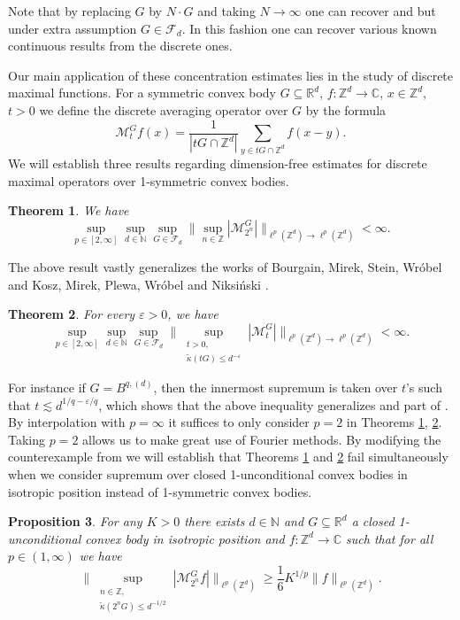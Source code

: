 \documentclass[a4paper,oneside, reqno]{amsart}
\numberwithin{equation}{section}
\newtheorem{Thm}{Theorem}[section]
\newtheorem{Prop}[Thm]{Proposition}
\theoremstyle{definition}%
\theoremstyle{definition}
\theoremstyle{definition}%
\theoremstyle{definition}
\newcommand{\Z}{\mathbb{Z}}
\newcommand{\R}{\mathbb{R}}
\newcommand{\C}{\mathbb{C}}
\newcommand{\N}{\mathbb{N}}
\begin{document}
Note that by replacing $G$ by $N\cdot G$ and taking $N \to \infty$ one can recover \cite[Theorem 1.2]{bob-naz} and \cite[Theorem 1.1]{Pa} but under extra assumption $G \in \mathcal{F}_d$. In this fashion one can recover various known continuous results from the discrete ones. 
\par Our main application of these concentration estimates lies in the study of discrete maximal functions.
For a symmetric convex body $G \subseteq \R^d$, $f: \Z^d \to \C$, $x \in \Z^d$, $t>0$ we define the discrete averaging operator over $G$ by the formula
\[
\mathcal{M}_t^G f(x)= \frac{1}{|tG \cap \Z^d|} \sum_{y \in tG \cap \Z^d} f(x-y).
\]
We will establish three results regarding dimension-free estimates for discrete maximal operators over 1-symmetric convex bodies.
\begin{Thm} \label{dyadic dim-free}
 We have 
 \[
 \sup_{p \in [2,\infty]} \sup_{d \in \N} \sup_{G \in \mathcal{F}_d} \Big\| \sup_{n \in \Z} |\mathcal{M}_{2^n}^G| \Big\|_{\ell^p(\Z^d) \to \ell^p(\Z^d)}< \infty.
 \]
\end{Thm}
The above result vastly generalizes the works of Bourgain, Mirek, Stein, Wróbel \cite{balls} and Kosz, Mirek, Plewa, Wróbel \cite[Theorem 3]{KMPW} and Niksiński \cite{Ni2}.
\begin{Thm} \label{small scale dim-free}
 For every $\varepsilon>0$, we have 
 \[
 \sup_{p \in [2,\infty]} \sup_{d \in \N} \sup_{G \in \mathcal{F}_d} \Big\| \sup_{\substack{t>0, \\
 \widetilde{\kappa}(tG) \le d^{-\varepsilon}}} |\mathcal{M}_{t}^G| \Big\|_{\ell^p(\Z^d) \to \ell^p(\Z^d)}< \infty.
 \]
\end{Thm} 
For instance if $G=B^{q,(d)}$, then the innermost supremum is taken over $t$'s such that $t \lesssim d^{1/q-\varepsilon/q}$, which shows that the above inequality generalizes \cite[Theorem 1.1]{NW} and part of \cite[Theorem 1.15]{KNW}.
By interpolation with $p=\infty$ it suffices to only consider $p=2$ in Theorems \ref{dyadic dim-free}, \ref{small scale dim-free}. Taking $p=2$ allows us to make great use of Fourier methods.
By modifying the counterexample from \cite[Theorem 2]{cubes} we will establish that Theorems \ref{dyadic dim-free} and \ref{small scale dim-free} fail simultaneously when we consider supremum over closed 1-unconditional convex bodies in isotropic position instead of 1-symmetric convex bodies.
\begin{Prop} \label{counter-example}
    For any $K >0$ there exists $d \in \N$ and $G \subseteq \R^d$ a closed 1-unconditional convex body in isotropic position and $f: \Z^d \to \C$ such that for all $p \in (1, \infty)$ we have
    \[
    \Big\| \sup_{\substack{n \in \Z, \\ \widetilde{\kappa}(2^n G) \le d^{-1/2}}} |\mathcal{M}_{2^n}^G f| \Big\|_{\ell^p(\Z^d)} \ge \frac{1}{6} K^{1/p} \|f \|_{\ell^p(\Z^d)}.
    \]
\end{Prop}
\end{document}
